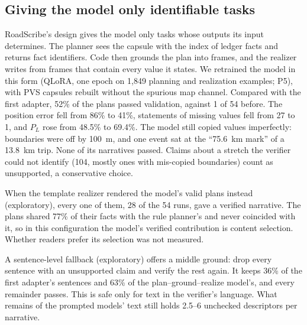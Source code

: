 \subsection{Giving the model only identifiable tasks}
\label{sec:pgr}
RoadScribe's design gives the model only tasks whose outputs its input determines.
The planner sees the capsule with the index of ledger facts and returns fact identifiers. Code then grounds the plan into frames, and the realizer writes from frames that contain every value it states.
We retrained the model in this form (QLoRA, one epoch on 1{,}849 planning and realization examples; P5), with PVS capsules rebuilt without the spurious map channel.
Compared with the first adapter, 52\% of the plans passed validation, against 1 of 54 before. The position error fell from 86\% to 41\%, statements of missing values fell from 27 to 1, and $P_L$ rose from 48.5\% to 69.4\%.
The model still copied values imperfectly: boundaries were off by 100~m, and one event sat at the ``75.6~km mark'' of a 13.8~km trip. None of its narratives passed. Claims about a stretch the verifier could not identify (104, mostly ones with mis-copied boundaries) count as unsupported, a conservative choice.

When the template realizer rendered the model's valid plans instead (exploratory), every one of them, 28 of the 54 runs, gave a verified narrative.
The plans shared 77\% of their facts with the rule planner's and never coincided with it, so in this configuration the model's verified contribution is content selection. Whether readers prefer its selection was not measured.

A sentence-level fallback (exploratory) offers a middle ground: drop every sentence with an unsupported claim and verify the rest again.
It keeps 36\% of the first adapter's sentences and 63\% of the plan--ground--realize model's, and every remainder passes.
This is safe only for text in the verifier's language. What remains of the prompted models' text still holds 2.5--6 unchecked descriptors per narrative.
